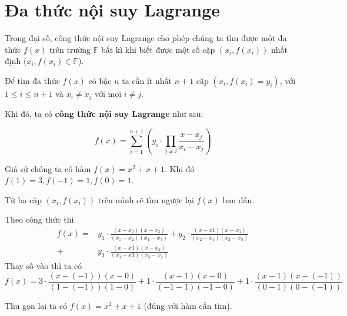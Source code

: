 \documentclass{mynotes}
\newcommand{\FF}{\mathbb{F}}
\begin{document}
\section{Đa thức nội suy Lagrange}

Trong đại số, công thức nội suy Lagrange cho phép chúng ta tìm được một đa thức $f(x)$ trên trường $\FF$ bất kì khi biết được một số cặp $(x_i, f(x_i))$ nhất định ($x_i, f(x_i) \in \FF$).

Để tìm đa thức $f(x)$ có bậc $n$ ta cần ít nhất $n+1$ cặp $(x_i, f(x_i) = y_i)$, với $1 \leqslant i \leqslant n+1$ và $x_i \neq x_j$ với mọi $i \neq j$.

Khi đó, ta có \textbf{công thức nội suy Lagrange} như sau:

\begin{equation*}
    \displaystyle{f(x) = \sum_{i=1}^{n+1} \left(y_i \cdot \prod_{j \neq i} \frac{x - x_j}{x_i - x_j}\right)}
\end{equation*}

\begin{example}
    Giả sử chúng ta có hàm $f(x) = x^2 + x + 1$. Khi đó $f(1) = 3, f(-1) = 1, f(0) = 1$.

    Từ ba cặp $(x_i, f(x_i))$ trên mình sẽ tìm ngược lại $f(x)$ ban đầu.

    Theo công thức thì
    \begin{align*}
        f(x) = & y_1 \cdot \frac{(x - x_2) (x - x_3)}{(x_1 - x_2) (x_1 - x_3)} + y_2 \cdot \frac{(x - x1) (x - x_3)}{(x_2 - x_1) (x_2 - x_3)} \\
        + & y_3 \cdot \frac{(x - x1) (x - x_2)}{(x_3 - x1) (x_3 - x_2)}
    \end{align*}
    Thay số vào thì ta có
    \begin{equation*}
        \displaystyle{f(x) = 3 \cdot \frac{(x - (-1)) (x - 0)}{(1 - (-1)) (1 - 0)} + 1 \cdot \frac{(x - 1) (x - 0)}{(-1 - 1) (-1 - 0)} + 1 \cdot \frac{(x - 1) (x - (-1))}{(0 - 1) (0 - (-1))}}
    \end{equation*}

    Thu gọn lại ta có $f(x) = x^2 + x + 1$ (đúng với hàm cần tìm).
\end{example}
\end{document}
